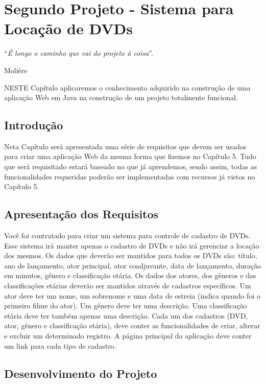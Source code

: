 \chapter{Segundo Projeto - Sistema para Locação de DVDs}
\epigraph{``\textit{É longo o caminho que vai do projeto à coisa}''.}{Molière}

\lettrine[lines=4, lhang=0.1, lraise=0, loversize=0.2, findent=0.1em]{\textcolor{corAzulTema}{N}}{ESTE} Capítulo aplicaremos o conhecimento adquirido na construção de uma aplicação Web em Java na construção de um projeto totalmente funcional.


\section{Introdução}

Neta Capítulo será apresentada uma série de requisitos que devem ser usados para criar uma aplicação Web da mesma forma que fizemos no Capítulo 5. Tudo que será requisitado estará baseado no que já aprendemos, sendo assim, todas as funcionalidades requeridas poderão ser implementadas com recursos já vistos no Capítulo 5.


\section{Apresentação dos Requisitos}

Você foi contratado para criar um sistema para controle de cadastro de DVDs. Esse sistema irá manter apenas o cadastro de DVDs e não irá gerenciar a locação dos mesmos. Os dados que deverão ser mantidos para todos os DVDs são: título, ano de lançamento, ator principal, ator coadjuvante, data de lançamento, duração em minutos, gênero e classificação etária. Os dados dos atores, dos gêneros e das classificações etárias deverão ser mantidos através de cadastros específicos. Um ator deve ter um nome, um sobrenome e uma data de estreia (indica quando foi o primeiro filme do ator). Um gênero deve ter uma descrição. Uma classificação etária deve ter também apenas uma descrição. Cada um dos cadastros (DVD, ator, gênero e classificação etária), deve conter as funcionalidades de criar, alterar e excluir um determinado registro. A página principal da aplicação deve conter um link para cada tipo de cadastro.


\section{Desenvolvimento do Projeto}

